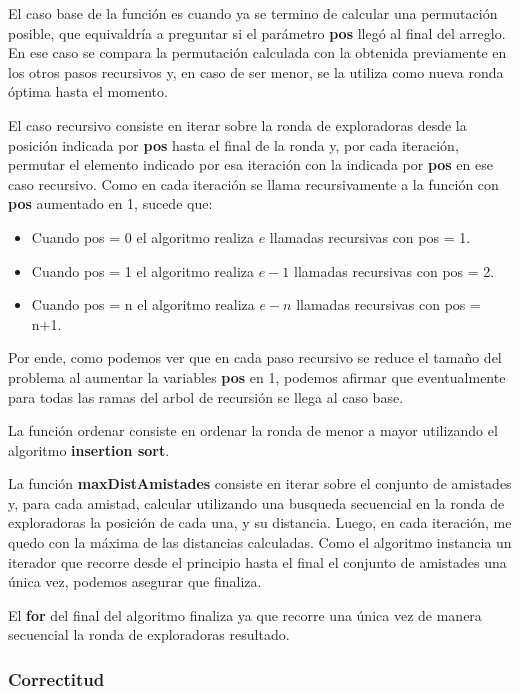 \documentclass[11pt]{article}
\begin{document}
El caso base de la función es cuando ya se termino de calcular una permutación posible, que equivaldría a 
preguntar si el parámetro \textbf{pos} llegó al final del arreglo. En ese caso se compara la 
permutación calculada con la obtenida previamente en los otros pasos recursivos y, en caso de ser menor, se 
la utiliza como nueva ronda óptima hasta el momento.

El caso recursivo consiste en iterar sobre la ronda de exploradoras desde la posición indicada por \textbf{pos} 
hasta el final de la ronda y, por cada iteración, permutar el elemento indicado por esa iteración con la indicada por 
\textbf{pos} en ese caso recursivo. 
Como en cada iteración se llama recursivamente a la función con \textbf{pos} aumentado en 1, sucede que:

\begin{itemize}
\item Cuando pos = 0 el algoritmo realiza $e$ llamadas recursivas con pos = 1.
\item Cuando pos = 1 el algoritmo realiza $e-1$ llamadas recursivas con pos = 2.
\item Cuando pos = n el algoritmo realiza $e-n$ llamadas recursivas con pos = n+1.
\end{itemize}

Por ende, como podemos ver que en cada paso recursivo se reduce el tamaño del problema al aumentar la variables 
\textbf{pos} en 1, podemos afirmar que eventualmente para todas las ramas del arbol de recursión se llega al caso base.

La función ordenar consiste en ordenar la ronda de menor a mayor utilizando el algoritmo \textbf{insertion sort}.

La función \textbf{maxDistAmistades} consiste en iterar sobre el conjunto de amistades y, para cada amistad, 
calcular utilizando una busqueda secuencial en la ronda de exploradoras la posición de cada una, y su distancia.
Luego, en cada iteración, me quedo con la máxima de las distancias calculadas.
Como el algoritmo instancia un iterador que recorre desde el principio hasta el final el conjunto de amistades 
una única vez, podemos asegurar que finaliza.

El \textbf{for} del final del algoritmo finaliza ya que recorre una única vez de manera secuencial la ronda 
de exploradoras resultado.

\subsubsection{Correctitud}
\end{document}
